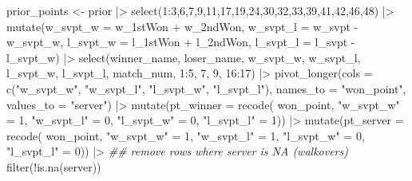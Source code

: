 \documentclass[
  letterpaper,
  DIV=11,
  numbers=noendperiod]{scrartcl}
\newenvironment{Shaded}{\begin{snugshade}}{\end{snugshade}}
\newcommand{\AttributeTok}[1]{\textcolor[rgb]{0.40,0.45,0.13}{#1}}
\newcommand{\DecValTok}[1]{\textcolor[rgb]{0.68,0.00,0.00}{#1}}
\newcommand{\DocumentationTok}[1]{\textcolor[rgb]{0.37,0.37,0.37}{\textit{#1}}}
\newcommand{\FunctionTok}[1]{\textcolor[rgb]{0.28,0.35,0.67}{#1}}
\newcommand{\NormalTok}[1]{\textcolor[rgb]{0.00,0.23,0.31}{#1}}
\newcommand{\OtherTok}[1]{\textcolor[rgb]{0.00,0.23,0.31}{#1}}
\newcommand{\SpecialCharTok}[1]{\textcolor[rgb]{0.37,0.37,0.37}{#1}}
\newcommand{\StringTok}[1]{\textcolor[rgb]{0.13,0.47,0.30}{#1}}
\begin{document}
\begin{Shaded}
\begin{Highlighting}[]
\NormalTok{  prior\_points }\OtherTok{\textless{}{-}}\NormalTok{ prior }\SpecialCharTok{|\textgreater{}}
    \FunctionTok{select}\NormalTok{(}\DecValTok{1}\SpecialCharTok{:}\DecValTok{3}\NormalTok{,}\DecValTok{6}\NormalTok{,}\DecValTok{7}\NormalTok{,}\DecValTok{9}\NormalTok{,}\DecValTok{11}\NormalTok{,}\DecValTok{17}\NormalTok{,}\DecValTok{19}\NormalTok{,}\DecValTok{24}\NormalTok{,}\DecValTok{30}\NormalTok{,}\DecValTok{32}\NormalTok{,}\DecValTok{33}\NormalTok{,}\DecValTok{39}\NormalTok{,}\DecValTok{41}\NormalTok{,}\DecValTok{42}\NormalTok{,}\DecValTok{46}\NormalTok{,}\DecValTok{48}\NormalTok{) }\SpecialCharTok{|\textgreater{}}
    \FunctionTok{mutate}\NormalTok{(}\AttributeTok{w\_svpt\_w =}\NormalTok{ w\_1stWon }\SpecialCharTok{+}\NormalTok{ w\_2ndWon,}
           \AttributeTok{w\_svpt\_l =}\NormalTok{ w\_svpt }\SpecialCharTok{{-}}\NormalTok{ w\_svpt\_w,}
           \AttributeTok{l\_svpt\_w =}\NormalTok{ l\_1stWon }\SpecialCharTok{+}\NormalTok{ l\_2ndWon,}
           \AttributeTok{l\_svpt\_l =}\NormalTok{ l\_svpt }\SpecialCharTok{{-}}\NormalTok{ l\_svpt\_w) }\SpecialCharTok{|\textgreater{}}
    \FunctionTok{select}\NormalTok{(winner\_name, loser\_name, w\_svpt\_w, w\_svpt\_l, }
\NormalTok{           l\_svpt\_w, l\_svpt\_l, match\_num,}
           \DecValTok{1}\SpecialCharTok{:}\DecValTok{5}\NormalTok{, }\DecValTok{7}\NormalTok{, }\DecValTok{9}\NormalTok{, }\DecValTok{16}\SpecialCharTok{:}\DecValTok{17}\NormalTok{) }\SpecialCharTok{|\textgreater{}}
    \FunctionTok{pivot\_longer}\NormalTok{(}\AttributeTok{cols =} \FunctionTok{c}\NormalTok{(}\StringTok{"w\_svpt\_w"}\NormalTok{, }\StringTok{"w\_svpt\_l"}\NormalTok{, }\StringTok{"l\_svpt\_w"}\NormalTok{, }\StringTok{"l\_svpt\_l"}\NormalTok{),}
                 \AttributeTok{names\_to =} \StringTok{"won\_point"}\NormalTok{,}
                 \AttributeTok{values\_to =} \StringTok{"server"}\NormalTok{) }\SpecialCharTok{|\textgreater{}}
    \FunctionTok{mutate}\NormalTok{(}\AttributeTok{pt\_winner =} \FunctionTok{recode}\NormalTok{(}
\NormalTok{      won\_point,}
      \StringTok{"w\_svpt\_w"} \OtherTok{=} \DecValTok{1}\NormalTok{,}
      \StringTok{"w\_svpt\_l"} \OtherTok{=} \DecValTok{0}\NormalTok{,}
      \StringTok{"l\_svpt\_w"} \OtherTok{=} \DecValTok{0}\NormalTok{,}
      \StringTok{"l\_svpt\_l"} \OtherTok{=} \DecValTok{1}\NormalTok{)) }\SpecialCharTok{|\textgreater{}}
    \FunctionTok{mutate}\NormalTok{(}\AttributeTok{pt\_server =} \FunctionTok{recode}\NormalTok{(}
\NormalTok{      won\_point,}
      \StringTok{"w\_svpt\_w"} \OtherTok{=} \DecValTok{1}\NormalTok{,}
      \StringTok{"w\_svpt\_l"} \OtherTok{=} \DecValTok{1}\NormalTok{,}
      \StringTok{"l\_svpt\_w"} \OtherTok{=} \DecValTok{0}\NormalTok{,}
      \StringTok{"l\_svpt\_l"} \OtherTok{=} \DecValTok{0}\NormalTok{)) }\SpecialCharTok{|\textgreater{}}
    \DocumentationTok{\#\# remove rows where server is NA (walkovers)}
    \FunctionTok{filter}\NormalTok{(}\SpecialCharTok{!}\FunctionTok{is.na}\NormalTok{(server))}
  

\end{Highlighting}
\end{Shaded}
\end{document}
